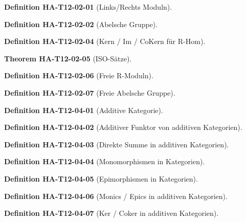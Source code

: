 \documentclass[10pt, letterpaper]{article}
\newcommand{\CustomHeading}[3]{%
  \par\medskip\noindent%
  \textbf{#1 #2} \textnormal{(#3)}.\enskip%
}
\newenvironment{DEF}[2]{\CustomHeading{Definition}{#1}{#2}}{}
\newenvironment{THEO}[2]{\CustomHeading{Theorem}{#1}{#2}}{}
\begin{document}
\begin{DEF}{HA-T12-02-01}{Links/Rechts Moduln}
\end{DEF}

\begin{DEF}{HA-T12-02-02}{Abelsche Gruppe}
\end{DEF}

\begin{DEF}{HA-T12-02-04}{Kern / Im / CoKern für R-Hom}
\end{DEF}

\begin{THEO}{HA-T12-02-05}{ISO-Sätze}
\end{THEO}

\begin{DEF}{HA-T12-02-06}{Freie R-Moduln}
\end{DEF}

\begin{DEF}{HA-T12-02-07}{Freie Abelsche Gruppe}
\end{DEF}

\begin{DEF}{HA-T12-04-01}{Additive Kategorie}
\end{DEF}

\begin{DEF}{HA-T12-04-02}{Additiver Funktor von additiven Kategorien}
\end{DEF}

\begin{DEF}{HA-T12-04-03}{Direkte Summe in additiven Kategorien}
\end{DEF}

\begin{DEF}{HA-T12-04-04}{Monomorphismen in Kategorien}
\end{DEF}

\begin{DEF}{HA-T12-04-05}{Epimorphismen in Kategorien}
\end{DEF}

\begin{DEF}{HA-T12-04-06}{Monics / Epics in additiven Kategorien}
\end{DEF}

\begin{DEF}{HA-T12-04-07}{Ker / Coker in additiven Kategorien}
\end{DEF}
\end{document}
